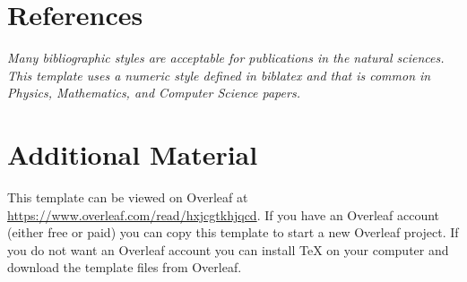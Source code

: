 \documentclass[11pt,a4paper,oneside]{report}
\newcommand{\instructions}[1]{{\color{black}\itshape #1}}
\begin{document}

\chapter*{References}
\label{references}


\instructions{Many bibliographic styles are acceptable for publications 
in the natural sciences. This template uses a numeric style defined in biblatex
and that is common in Physics, Mathematics, and Computer Science papers.}

\printbibliography[heading=none]


\appendix

\chapter{Additional Material}
\label{appendix-a}

This template can be viewed on Overleaf at \url{https://www.overleaf.com/read/hxjcgtkhjqcd}.
If you have an Overleaf account (either free or paid) you can copy this template to start a new Overleaf project.
If you do not want an Overleaf account you can install TeX on your computer and download the template files from Overleaf.
\end{document}
